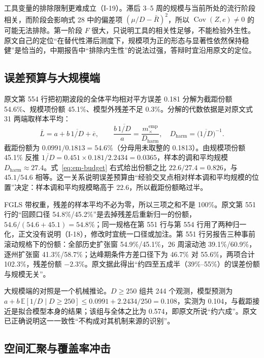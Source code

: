 工具变量的排除限制更难成立（I-19）。滞后 3--5 周的规模与当前所处的流行阶段相关，而阶段会影响式 28 中的偏差项 $(\mu/D-\bar R)^2$，所以 $\operatorname{Cov}(Z,e)\ne0$ 的可能无法排除。第一阶段 $F$ 很大，只说明工具的相关性足够，不能检验外生性。原文自己的定位“在替代性滞后测度下，规模项为正的形态与显著性依然保持稳健”是恰当的，中期报告中“排除内生性”的说法过强，答辩时宜沿用原文的定位。

\subsection{误差预算与大规模端}\label{sec:em-budget}

原文第 554 行把初期波段的全体平均相对平方误差 0.181 分解为截距份额 54.6\%、规模项份额 45.1\%、模型外残差不足 0.3\%。分解的代数依据是对原文式 31 两端取样本平均：
\begin{equation}\label{eq:em-budget}
\overline{L}=a+b\,\overline{1/D}+\overline{e},\qquad
\frac{b\,\overline{1/D}}{a}=\frac{m_\times^{\mathrm{emp}}}{D_{\mathrm{harm}}},\quad D_{\mathrm{harm}}=\big(\overline{1/D}\big)^{-1}.
\end{equation}
截距份额为 $0.0991/0.1813=54.6\%$（分母用未取整的 0.1813）。由规模项份额 45.1\% 反推 $\overline{1/D}=0.451\times0.181/2.2434=0.0365$，样本的调和平均规模 $D_{\mathrm{harm}}\approx27.4$。式~\ref{eq:em-budget} 右式给出份额之比 $22.6/27.4=0.826$，与 $45.1/54.6$ 相等。这一关系说明误差预算由“经验交叉点相对样本调和平均规模的位置”决定：样本调和平均规模略高于 22.6，所以截距份额略过半。

FGLS 带权重，残差的样本平均不必为零，所以三项之和不是 100\%。原文第 551 行的“回顾口径 54.8\%/45.2\%”是去掉残差后重新归一的份额，$54.6/(54.6+45.1)=54.8\%$；同一规格在第 551 行与第 554 行用了两种归一化，正文没有说明（I-18），修改时宜统一口径或加注。第 551 行另报告三种事前滚动规格下的份额：全部历史扩张窗 54.9\%/45.1\%，26 周滚动池 39.1\%/60.9\%，逐州扩张窗 41.3\%/58.7\%；达峰期条件方差口径下为 46.7\% 对 55.6\%，两项合计 102.3\%，残差份额 $-2.3\%$。原文据此得出“约四至五成半（39\%--55\%）的误差份额与规模无关”。

大规模端的对照是一个机械推论。$D\ge250$ 组共 244 个观测，模型预测为 $a+b\,\mathbb{E}[1/D\mid D\ge250]\le0.0991+2.2434/250=0.108$，实测为 0.104，与截距接近是拟合模型本身的结果；该组与全体之比为 0.574，即原文所说“约六成”。原文已正确说明这一一致性“不构成对其机制来源的识别”。

\subsection{空间汇聚与覆盖率冲击}\label{sec:em-space}


